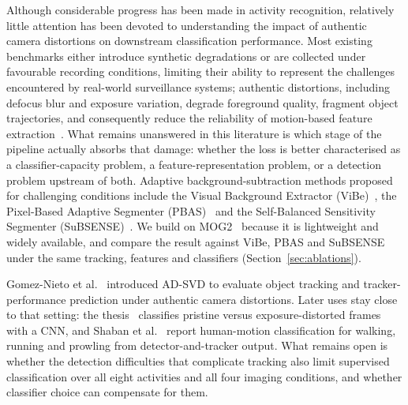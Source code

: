 \documentclass[runningheads]{llncs}
\begin{document}
Although considerable progress has been made in activity recognition, relatively little attention 
has been devoted to understanding the impact of authentic camera distortions on downstream 
classification performance. Most existing benchmarks either introduce synthetic degradations 
or are collected under favourable recording conditions, limiting their ability to represent 
the challenges encountered by real-world surveillance systems; authentic distortions, 
including defocus blur and exposure variation, degrade foreground quality, fragment object 
trajectories, and consequently reduce the reliability of motion-based feature 
extraction~\cite{gillani2025distortion}. What remains unanswered in this literature is which 
stage of the pipeline actually absorbs that damage: whether the loss is better characterised 
as a classifier-capacity problem, a feature-representation problem, or a detection problem 
upstream of both. Adaptive background-subtraction methods proposed for challenging conditions include the 
Visual Background Extractor (ViBe)~\cite{barnich2011vibe}, the Pixel-Based Adaptive 
Segmenter (PBAS)~\cite{hofmann2012background} and the Self-Balanced Sensitivity Segmenter 
(SuBSENSE)~\cite{stcharles2015subsense}. We build on MOG2~\cite{zivkovic2004improved,zivkovic2006efficient} 
because it is lightweight and widely available, and compare the result against ViBe, PBAS and 
SuBSENSE under the same tracking, features and classifiers (Section~\ref{sec:ablations}).

Gomez-Nieto et al.~\cite{9698081} introduced AD-SVD to evaluate object tracking and 
tracker-performance prediction under authentic camera distortions. Later uses stay close to 
that setting: the thesis~\cite{gomeznieto2021thesis} classifies pristine versus 
exposure-distorted frames with a CNN, and Shaban et al.~\cite{shaban2024abnormal,shaban2025multicamera} 
report human-motion classification for walking, running and prowling from detector-and-tracker 
output. What remains open is whether the detection difficulties that complicate tracking also 
limit supervised classification over all eight activities and all four imaging conditions, 
and whether classifier choice can compensate for them.
\end{document}
